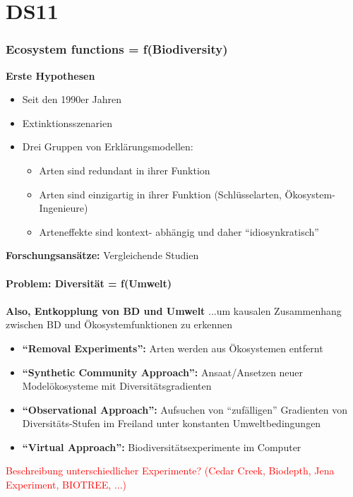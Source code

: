 \section{DS11}
\subsubsection{Ecosystem functions = f(Biodiversity)}
\textbf{Erste Hypothesen}
\begin{itemize}
	\item Seit den 1990er Jahren
	\item Extinktionsszenarien
	\item Drei Gruppen von Erklärungsmodellen:
	\begin{itemize}
		\item Arten sind redundant in ihrer Funktion
		\item Arten sind einzigartig in ihrer Funktion (Schlüsselarten, Ökosystem-Ingenieure)
		\item Arteneffekte sind kontext- abhängig und daher “idiosynkratisch”
	\end{itemize}
\end{itemize}

\textbf{Forschungsansätze:} Vergleichende Studien
\\\\
\textbf{Problem: Diversität = f(Umwelt)}
\\\\
\textbf{Also, Entkopplung von BD und Umwelt}
...um kausalen Zusammenhang zwischen BD und Ökosystemfunktionen zu erkennen
\begin{itemize}
	\item \textbf{“Removal Experiments”:} Arten werden aus Ökosystemen entfernt
	\item \textbf{“Synthetic Community Approach”:} Ansaat/Ansetzen neuer Modelökosysteme mit Diversitätsgradienten
	\item \textbf{“Observational Approach”:} Aufsuchen von “zufälligen” Gradienten von Diversitäts-Stufen im Freiland unter konstanten Umweltbedingungen
	\item \textbf{“Virtual Approach”:} Biodiversitätsexperimente im Computer
\end{itemize}

\textcolor{red}{Beschreibung unterschiedlicher Experimente? (Cedar Creek, Biodepth, Jena Experiment, BIOTREE, ...)}

\newpage

